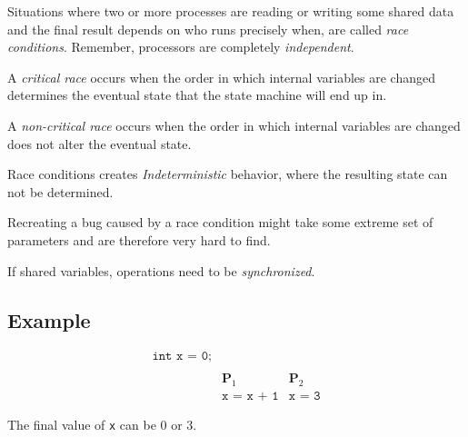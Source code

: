 
Situations where two or more processes are reading or writing some shared data and the final result depends on who runs precisely when, are called \emph{race conditions}. Remember, processors are completely \emph{independent}.

A \emph{critical race} occurs when the order in which internal variables are changed determines the eventual state that the state machine will end up in.

A \emph{non-critical race} occurs when the order in which internal variables are changed does not alter the eventual state.

Race conditions creates \emph{Indeterministic} behavior, where the resulting state can not be determined.

Recreating a bug caused by a race condition might take some extreme set of parameters and are therefore very hard to find.

If shared variables, operations need to be \emph{synchronized}.

\subsection{Example}
\begin{align*}
\texttt{int x = 0;} \\ \\
&\textbf{P}_1 &\textbf{P}_2 \\
&\texttt{x = x + 1} &\texttt{x = 3}
\end{align*}

The final value of \texttt{x} can be 0 or 3.
